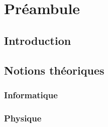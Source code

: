 \part{Préambule}
\chapter{Introduction}

\chapter{Notions théoriques}
\section{Informatique}

\section{Physique}